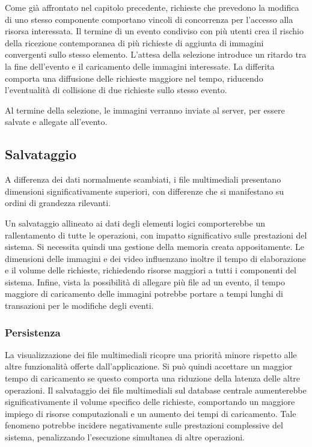 Come già affrontato nel capitolo precedente, richieste che prevedono la modifica di uno stesso componente comportano vincoli di concorrenza per l’accesso alla risorsa interessata. Il termine di un evento condiviso con più utenti crea il rischio  della ricezione contemporanea di più richieste di aggiunta di immagini convergenti sullo stesso elemento. L’attesa della selezione introduce un ritardo tra la fine dell’evento e il caricamento delle immagini interessate. La differita comporta una diffusione delle richieste maggiore nel tempo, riducendo l’eventualità di collisione di due richieste sullo stesso evento.

Al termine della selezione, le immagini verranno inviate al server, per essere salvate e allegate all’evento. 


\subsection{ Salvataggio}

A differenza dei dati normalmente scambiati, i file multimediali presentano dimensioni significativamente superiori, con differenze che si manifestano su ordini di grandezza rilevanti. 

Un salvataggio allineato ai dati degli elementi logici comporterebbe un rallentamento di tutte le operazioni, con impatto significativo sulle prestazioni del sistema. Si necessita quindi una gestione della memoria creata appositamente. 
Le dimensioni delle immagini e dei video influenzano inoltre il tempo di elaborazione e il volume delle richieste, richiedendo risorse maggiori a tutti i componenti del sistema. Infine, vista la possibilità di allegare più file ad un evento, il tempo maggiore di caricamento delle immagini potrebbe portare a tempi lunghi di transazioni per le modifiche degli eventi.


\subsubsection{Persistenza}

La visualizzazione dei file multimediali ricopre una priorità minore rispetto alle altre funzionalità offerte dall’applicazione. Si può quindi accettare un maggior tempo di caricamento se questo comporta una riduzione della latenza delle altre operazioni. Il salvataggio dei file multimediali sul database centrale aumenterebbe significativamente il volume specifico delle richieste, comportando un maggiore impiego di risorse computazionali e un aumento dei tempi di caricamento. Tale fenomeno potrebbe incidere negativamente sulle prestazioni complessive del sistema, penalizzando l'esecuzione simultanea di altre operazioni.

